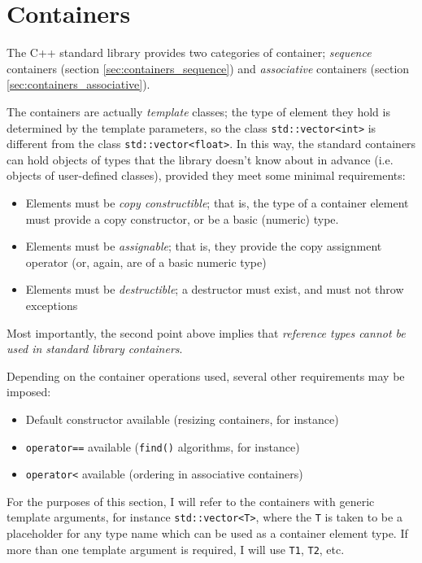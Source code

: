 \documentclass[a4paper]{scrartcl}
\begin{document}
\section{Containers}\label{sec:containers}
The C++ standard library provides two categories of container; \emph{sequence} containers (section \ref{sec:containers_sequence}) and \emph{associative} containers (section \ref{sec:containers_associative}).

The containers are actually \emph{template} classes; the type of element they hold is determined by the template parameters, so the class \verb|std::vector<int>| is different from the class \verb|std::vector<float>|. In this way, the standard containers can hold objects of types that the library doesn't know about in advance (i.e. objects of user-defined classes), provided they meet some minimal requirements:
\begin{itemize}
	\item Elements must be \emph{copy constructible}; that is, the type of a container element must provide a copy constructor, or be a basic (numeric) type.
	\item Elements must be \emph{assignable}; that is, they provide the copy assignment operator (or, again, are of a basic numeric type)
	\item Elements must be \emph{destructible}; a destructor must exist, and must not throw exceptions
\end{itemize}

Most importantly, the second point above implies that \emph{reference types cannot be used in standard library containers}.

Depending on the container operations used, several other requirements may be imposed:
\begin{itemize}
	\item Default constructor available (resizing containers, for instance)
	\item \verb|operator==| available (\verb|find()| algorithms, for instance)
	\item \verb|operator<| available (ordering in associative containers)
\end{itemize}

For the purposes of this section, I will refer to the containers with generic template arguments, for instance \verb|std::vector<T>|, where the \verb|T| is taken to be a placeholder for any type name which can be used as a container element type. If more than one template argument is required, I will use \verb|T1|, \verb|T2|, etc.
\end{document}
